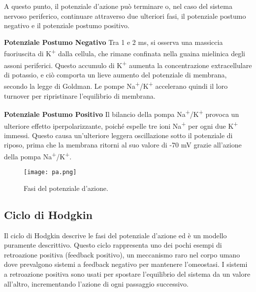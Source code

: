 \begin{description}
    A questo punto, il potenziale d'azione può terminare o, nel caso del sistema nervoso periferico, continuare attraverso due ulteriori fasi, il {potenziale postumo negativo} e il {potenziale postumo positivo}.
    
    \item \textbf{Potenziale Postumo Negativo} Tra 1 e 2 ms, si osserva una massiccia fuoriuscita di K\textsuperscript{+} dalla cellula, che rimane confinata nella guaina mielinica degli assoni periferici. Questo accumulo di K\textsuperscript{+} aumenta la concentrazione extracellulare di potassio, e ciò comporta un lieve aumento del potenziale di membrana, secondo la legge di Goldman. Le pompe Na\textsuperscript{+}/K\textsuperscript{+} accelerano quindi il loro turnover per ripristinare l’equilibrio di membrana.
    
    \item \textbf{Potenziale Postumo Positivo} Il bilancio della pompa Na\textsuperscript{+}/K\textsuperscript{+} provoca un ulteriore effetto iperpolarizzante, poiché espelle tre ioni Na\textsuperscript{+} per ogni due K\textsuperscript{+} immessi. Questo causa un'ulteriore leggera oscillazione sotto il potenziale di riposo, prima che la membrana ritorni al suo valore di -70 mV grazie all’azione della pompa Na\textsuperscript{+}/K\textsuperscript{+}.
\end{description}

\begin{figure}[h]
    \centering
    \texttt{[image: pa.png]}
    \caption{Fasi del potenziale d'azione.}
    \label{fig:pa}
\end{figure}


\subsection{Ciclo di Hodgkin}
Il ciclo di Hodgkin descrive le fasi del potenziale d'azione ed è un modello puramente descrittivo. Questo ciclo rappresenta uno dei pochi esempi di retroazione positiva (feedback positivo), un meccanismo raro nel corpo umano dove prevalgono sistemi a feedback negativo per mantenere l'omeostasi. I sistemi a retroazione positiva sono usati per spostare l'equilibrio del sistema da un valore all'altro, incrementando l'azione di ogni passaggio successivo.

